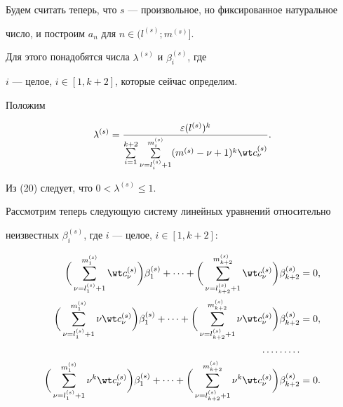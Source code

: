 Будем считать теперь, что $s$ --- произвольное, но фиксированное натуральное 


число, и построим $a_n$ для $n \in (l^{(s)}; m^{(s)}]$.


Для этого понадобятся числа $\lambda^{(s)}$ и $\beta_i^{(s)}$, где 


$i$ --- целое, $i \in [1, k+2]$, которые сейчас определим.


Положим 


\begin{equation}


\lambda^{(s)}=\frac{\varepsilon (l^{(s)})^k}


{\sum\limits_{i=1}^{k+2} \sum\limits_{\nu=l_i^{(s)}+1}^{m_i^{(s)}} 


(m^{(s)}-\nu+1)^k \wt c{}_{\nu}^{(s)}}.


\end{equation}


Из (20) следует, что $0<\lambda^{(s)} \le 1$. 





Рассмотрим теперь следующую систему линейных уравнений относительно 


неизвестных $\beta_i^{(s)}$, где $i$ --- целое, $i \in [1, k+2]$:


\begin{equation}


\begin{split}


\bigg(\sum_{\nu=l_1^{(s)}+1}^{m_1^{(s)}} \wt c{}_{\nu}^{(s)}\bigg)


\beta_1^{(s)}+\dotsb+\bigg(\sum_{\nu=l_{k+2}^{(s)}+1}^{m_{k+2}^{(s)}}


\wt c{}_{\nu}^{(s)}\bigg) \beta_{k+2}^{(s)}&=0,\\


%


\bigg(\sum_{\nu=l_1^{(s)}+1}^{m_1^{(s)}} \nu \wt c{}_{\nu}^{(s)}\bigg)


\beta_1^{(s)}+\dotsb+\bigg(\sum_{\nu=l_{k+2}^{(s)}+1}^{m_{k+2}^{(s)}}


\nu \wt c{}_{\nu}^{(s)}\bigg) \beta_{k+2}^{(s)}&=0, \\


%


\dotsc\dotsc\dotsc& \phantom{=}\\


%


\bigg(\sum_{\nu=l_1^{(s)}+1}^{m_1^{(s)}} \nu^k \wt c{}_{\nu}^{(s)}\bigg)


\beta_1^{(s)}+\dotsb+\bigg(\sum_{\nu=l_{k+2}^{(s)}+1}^{m_{k+2}^{(s)}}


\nu^k \wt c{}_{\nu}^{(s)}\bigg) \beta_{k+2}^{(s)}&=0.


\end{split}


\end{equation}





